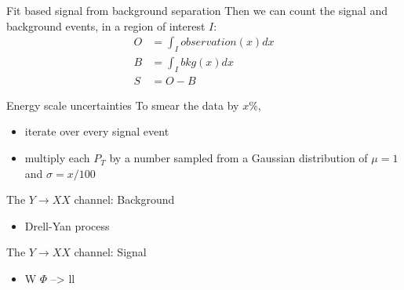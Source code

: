 \documentclass[bigger]{beamer}
\begin{document}
\begin{frame}[label={sec:org9e39906}]{Fit based signal from background separation}
Then we can count the signal and background events, in a region of interest \(I\):
\begin{align}
O &= \int_{I} observation(x) dx \\
B &= \int_{I} bkg(x) dx\\
S &= O - B
\end{align}
\end{frame}

\begin{frame}[label={sec:orgac2808d}]{Energy scale uncertainties}
To smear the data by \(x\%\),
\begin{itemize}
\item iterate over every signal event
\item multiply each \(P_{T}\) by a number sampled from a Gaussian distribution of \(\mu = 1\) and \(\sigma = x/100\)
\end{itemize}
\end{frame}
\begin{frame}[label={sec:orgb85483a}]{The \(Y \rightarrow XX\) channel: Background}
\begin{itemize}
\item Drell-Yan process
\end{itemize}
\end{frame}

\begin{frame}[label={sec:org0bd9e00}]{The \(Y \rightarrow XX\) channel: Signal}
\begin{itemize}
\item W \(\Phi\) --> ll
\end{itemize}
\end{frame}
\end{document}
